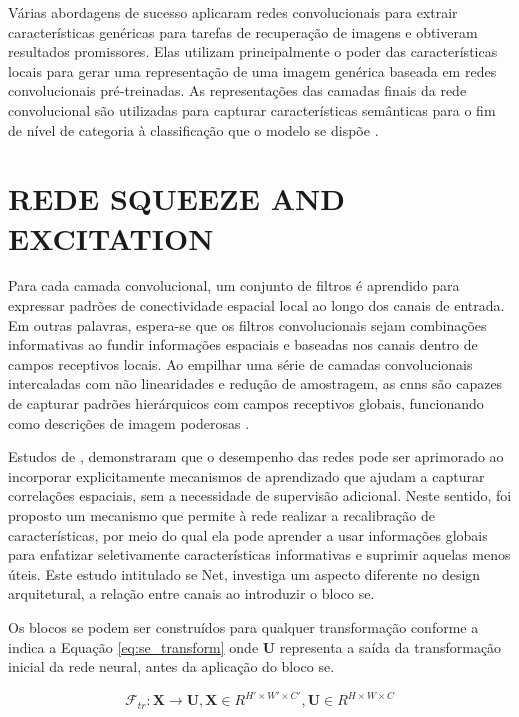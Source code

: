 Várias abordagens de sucesso aplicaram redes convolucionais para extrair características genéricas para tarefas de recuperação de imagens e obtiveram resultados promissores. Elas utilizam principalmente o poder das características locais para gerar uma representação de uma imagem genérica baseada em redes convolucionais pré-treinadas. As representações das camadas finais da rede convolucional são utilizadas para capturar características semânticas para o fim de nível de categoria à classificação que o modelo se dispõe \cite{alzubiContentbasedImageRetrieval2017b}.

\section{REDE SQUEEZE AND EXCITATION}
\label{sec:se_net}

Para cada camada convolucional, um conjunto de filtros é aprendido para expressar padrões de conectividade espacial local ao longo dos canais de entrada. Em outras palavras, espera-se que os filtros convolucionais sejam combinações informativas ao fundir informações espaciais e baseadas nos canais dentro de campos receptivos locais.
Ao empilhar uma série de camadas convolucionais intercaladas com não linearidades e redução de amostragem, as \gls{cnn}s são capazes de capturar padrões hierárquicos com campos receptivos globais, funcionando como descrições de imagem poderosas \cite{huSqueezeandExcitationNetworks2018}. 

Estudos de , demonstraram que o desempenho das redes pode ser aprimorado ao incorporar explicitamente mecanismos de aprendizado que ajudam a capturar correlações espaciais, sem a necessidade de supervisão adicional. Neste sentido, foi proposto um mecanismo que permite à rede realizar a recalibração de características, por meio do qual ela pode aprender a usar informações globais para enfatizar seletivamente características informativas e suprimir aquelas menos úteis. Este estudo intitulado \gls{se} Net, investiga um aspecto diferente no design arquitetural, a relação entre canais ao introduzir o bloco \gls{se}.

Os blocos \gls{se} podem ser construídos para qualquer transformação conforme a indica a Equação \ref{eq:se_transform} onde $\mathbf{U}$ representa a saída da transformação inicial da rede neural, antes da aplicação do bloco \gls{se}.

\begin{equation}
\mathcal{F}_{tr} : \mathbf{X} \rightarrow \mathbf{U}, \mathbf{X} \in R^{H' \times W' \times C'}, \mathbf{U} \in R^{H \times W \times C}
\label{eq:se_transform}
\end{equation}

